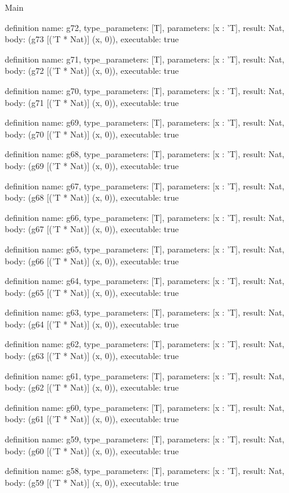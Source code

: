\begin{lexlean}{Main}
\begin{semanticmodule}
definition{
  name: g72,
  type_parameters: [T],
  parameters: [x : 'T],
  result: Nat,
  body: (g73 [('T * Nat)] (x, 0)),
  executable: true
}

definition{
  name: g71,
  type_parameters: [T],
  parameters: [x : 'T],
  result: Nat,
  body: (g72 [('T * Nat)] (x, 0)),
  executable: true
}

definition{
  name: g70,
  type_parameters: [T],
  parameters: [x : 'T],
  result: Nat,
  body: (g71 [('T * Nat)] (x, 0)),
  executable: true
}

definition{
  name: g69,
  type_parameters: [T],
  parameters: [x : 'T],
  result: Nat,
  body: (g70 [('T * Nat)] (x, 0)),
  executable: true
}

definition{
  name: g68,
  type_parameters: [T],
  parameters: [x : 'T],
  result: Nat,
  body: (g69 [('T * Nat)] (x, 0)),
  executable: true
}

definition{
  name: g67,
  type_parameters: [T],
  parameters: [x : 'T],
  result: Nat,
  body: (g68 [('T * Nat)] (x, 0)),
  executable: true
}

definition{
  name: g66,
  type_parameters: [T],
  parameters: [x : 'T],
  result: Nat,
  body: (g67 [('T * Nat)] (x, 0)),
  executable: true
}

definition{
  name: g65,
  type_parameters: [T],
  parameters: [x : 'T],
  result: Nat,
  body: (g66 [('T * Nat)] (x, 0)),
  executable: true
}

definition{
  name: g64,
  type_parameters: [T],
  parameters: [x : 'T],
  result: Nat,
  body: (g65 [('T * Nat)] (x, 0)),
  executable: true
}

definition{
  name: g63,
  type_parameters: [T],
  parameters: [x : 'T],
  result: Nat,
  body: (g64 [('T * Nat)] (x, 0)),
  executable: true
}

definition{
  name: g62,
  type_parameters: [T],
  parameters: [x : 'T],
  result: Nat,
  body: (g63 [('T * Nat)] (x, 0)),
  executable: true
}

definition{
  name: g61,
  type_parameters: [T],
  parameters: [x : 'T],
  result: Nat,
  body: (g62 [('T * Nat)] (x, 0)),
  executable: true
}

definition{
  name: g60,
  type_parameters: [T],
  parameters: [x : 'T],
  result: Nat,
  body: (g61 [('T * Nat)] (x, 0)),
  executable: true
}

definition{
  name: g59,
  type_parameters: [T],
  parameters: [x : 'T],
  result: Nat,
  body: (g60 [('T * Nat)] (x, 0)),
  executable: true
}

definition{
  name: g58,
  type_parameters: [T],
  parameters: [x : 'T],
  result: Nat,
  body: (g59 [('T * Nat)] (x, 0)),
  executable: true
}


\end{semanticmodule}
\end{lexlean}
